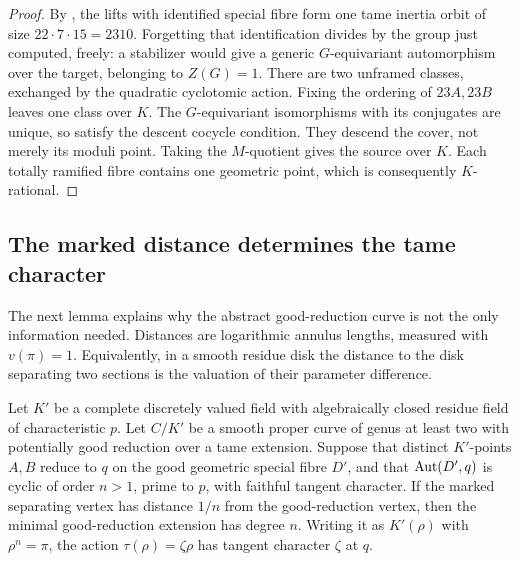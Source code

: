 \begin{proof}
By \cite[Proposition~4.4 and Theorem~4.5]{Wewers}, the lifts with
identified special fibre form one tame inertia orbit of size
$22\cdot7\cdot15=2310$.  Forgetting that identification divides by
the group just computed, freely: a stabilizer would give a generic
$G$-equivariant automorphism over the target, belonging to $Z(G)=1$.
There are two unframed classes, exchanged by the quadratic cyclotomic
action.  Fixing the ordering of $23A,23B$ leaves one class over $K$.
The $G$-equivariant isomorphisms with its conjugates are unique, so
satisfy the descent cocycle condition.  They descend the cover, not
merely its moduli point.  Taking the $M$-quotient gives the source
over $K$.  Each totally ramified fibre contains one geometric point,
which is consequently $K$-rational.
\end{proof}

\subsection{The marked distance determines the tame character}

The next lemma explains why the abstract good-reduction curve is not
the only information needed.  Distances are logarithmic annulus
lengths, measured with $v(\pi)=1$.  Equivalently, in a smooth residue
disk the distance to the disk separating two sections is the
valuation of their parameter difference.

\begin{lemma}
\label{lem:marked-distance}
Let $K'$ be a complete discretely valued field with algebraically
closed residue field of characteristic $p$.  Let $C/K'$ be a smooth
proper curve of genus at least two with potentially good reduction
over a tame extension.  Suppose that distinct $K'$-points $A,B$
reduce to $q$ on the good geometric special fibre $D'$, and that
$\operatorname{Aut}(D',q)$ is cyclic of order $n>1$, prime to $p$, with faithful
tangent character.  If the marked separating vertex has distance
$1/n$ from the good-reduction vertex, then the minimal good-reduction
extension has degree $n$.  Writing it as $K'(\rho)$ with
$\rho^n=\pi$, the action $\tau(\rho)=\zeta\rho$ has tangent
character $\zeta$ at $q$.
\end{lemma}

